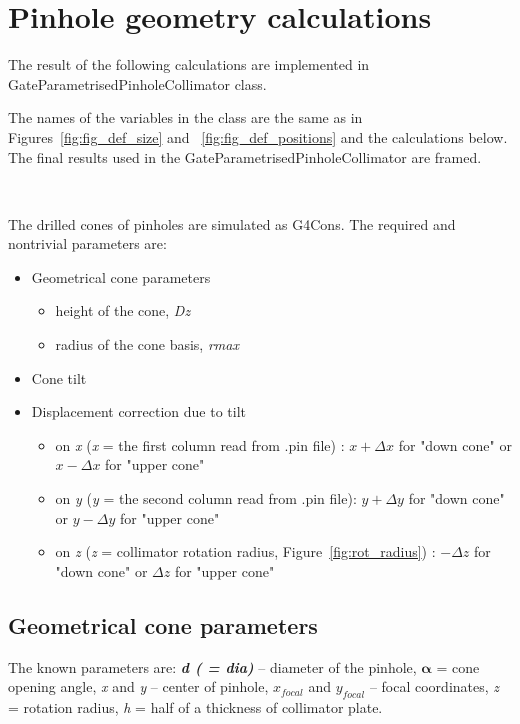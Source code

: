 \documentclass[12pt]{article}
\begin{document}
\clearpage
\section{Pinhole geometry calculations}
The result of the following calculations are implemented in GateParametrisedPinholeCollimator class.

The names of the variables in the class are the same as in Figures~\ref{fig:fig_def_size} and ~\ref{fig:fig_def_positions} and the calculations below. The final results used in the GateParametrisedPinholeCollimator are framed.

\

The drilled cones of pinholes are simulated as G4Cons. The required and nontrivial parameters are: 
\begin{itemize}
\item Geometrical cone parameters
	\begin{itemize}
	\item height of the cone, \textit{Dz} 
	\item radius of the cone basis, \textit{rmax}
	\end{itemize}	
\item Cone tilt 
\item Displacement correction due to tilt
	\begin{itemize}
	\item  on \textit{x} (\textit{x} = the first column read from .pin file) : $x+\Delta x$ for "down cone" or $x-\Delta x$ for "upper cone"
	\item on \textit{y} (\textit{y} = the second column read from .pin file): $y+\Delta y$ for "down cone" or $y-\Delta y$ for "upper cone"
	\item on \textit{z} (\textit{z} = collimator rotation radius, Figure~\ref{fig:rot_radius}) : $-\Delta z$ for "down cone" or $\Delta z$ for "upper cone" 
	\end{itemize}	
\end{itemize}


\subsection{Geometrical cone parameters}

The known parameters are: \textbf{\textit{d ( = dia)}} -- diameter of the pinhole, $\mathbf{\alpha}$ = cone opening angle, \textit{x} and \textit{y} -- center of pinhole, $x_{focal}$ and $y_{focal}$ -- focal coordinates, \textit{z} = rotation radius, \textit{h} = half of a thickness of collimator plate.
\end{document}
